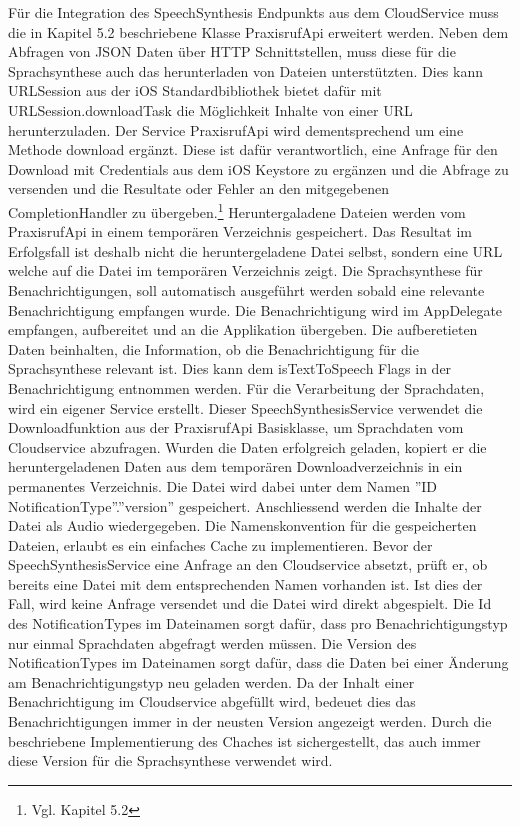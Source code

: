 Für die Integration des SpeechSynthesis Endpunkts aus dem CloudService muss die in Kapitel 5.2 beschriebene Klasse PraxisrufApi erweitert werden.
Neben dem Abfragen von JSON Daten über HTTP Schnittstellen, muss diese für die Sprachsynthese auch das herunterladen von Dateien unterstützten.
Dies kann URLSession aus der iOS Standardbibliothek bietet dafür mit URLSession.downloadTask die Möglichkeit Inhalte von einer URL herunterzuladen.\cite{ios_downloadtask}
Der Service PraxisrufApi wird dementsprechend um eine Methode download ergänzt.
Diese ist dafür verantwortlich, eine Anfrage für den Download mit Credentials aus dem iOS Keystore zu ergänzen und die Abfrage zu versenden
und die Resultate oder Fehler an den mitgegebenen CompletionHandler zu übergeben.\footnote{Vgl. Kapitel 5.2}
Heruntergaladene Dateien werden vom PraxisrufApi in einem temporären Verzeichnis gespeichert.
Das Resultat im Erfolgsfall ist deshalb nicht die heruntergeladene Datei selbst, sondern eine URL welche auf die Datei im temporären Verzeichnis zeigt.
Die Sprachsynthese für Benachrichtigungen, soll automatisch ausgeführt werden sobald eine relevante Benachrichtigung empfangen wurde.
Die Benachrichtigung wird im AppDelegate empfangen, aufbereitet und an die Applikation übergeben.
Die aufberetieten Daten beinhalten, die Information, ob die Benachrichtigung für die Sprachsynthese relevant ist.
Dies kann dem isTextToSpeech Flags in der Benachrichtigung entnommen werden.
Für die Verarbeitung der Sprachdaten, wird ein eigener Service erstellt.
Dieser SpeechSynthesisService verwendet die Downloadfunktion aus der PraxisrufApi Basisklasse, um Sprachdaten vom Cloudservice abzufragen.
Wurden die Daten erfolgreich geladen, kopiert er die heruntergeladenen Daten aus dem temporären Downloadverzeichnis in ein permanentes Verzeichnis.
Die Datei wird dabei unter dem Namen ''ID NotificationType''.''version'' gespeichert.
Anschliessend werden die Inhalte der Datei als Audio wiedergegeben.
Die Namenskonvention für die gespeicherten Dateien, erlaubt es ein einfaches Cache zu implementieren.
Bevor der SpeechSynthesisService eine Anfrage an den Cloudservice absetzt, prüft er, ob bereits eine Datei mit dem entsprechenden Namen vorhanden ist.
Ist dies der Fall, wird keine Anfrage versendet und die Datei wird direkt abgespielt.
Die Id des NotificationTypes im Dateinamen sorgt dafür, dass pro Benachrichtigungstyp nur einmal Sprachdaten abgefragt werden müssen.
Die Version des NotificationTypes im Dateinamen sorgt dafür, dass die Daten bei einer Änderung am Benachrichtigungstyp neu geladen werden.
Da der Inhalt einer Benachrichtigung im Cloudservice abgefüllt wird, bedeuet dies das Benachrichtigungen immer in der neusten Version angezeigt werden.
Durch die beschriebene Implementierung des Chaches ist sichergestellt, das auch immer diese Version für die Sprachsynthese verwendet wird.


